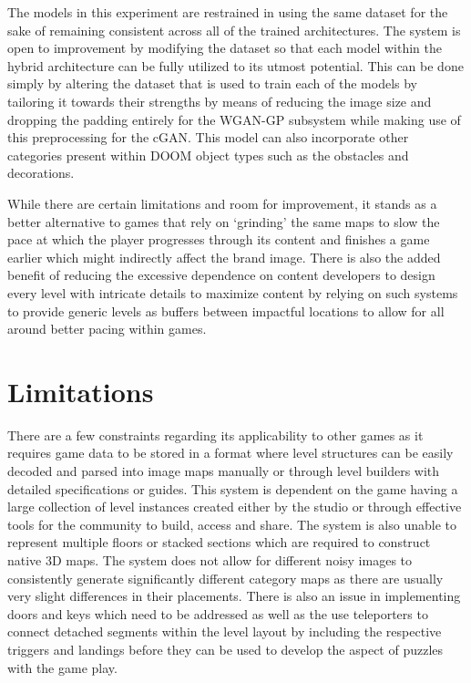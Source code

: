 \documentclass{Configuration_Files/PoliMi3i_thesis}
\begin{document}
The models in this experiment are restrained in using the same dataset for the sake of 
remaining consistent across all of the trained architectures. The system is open to 
improvement by modifying the dataset so that each model within the hybrid 
architecture can be fully utilized to its utmost potential. This can be done simply by 
altering the dataset that is used to train each of the models by tailoring it towards 
their strengths by means of reducing the image size and dropping the padding
entirely for the WGAN-GP subsystem while making use of this preprocessing for the 
cGAN. This model can also incorporate other categories present within DOOM object 
types such as the obstacles and decorations.

While there are certain limitations and room for improvement, it stands as a better 
alternative to games that rely on ‘grinding’ the same maps to slow the pace at which 
the player progresses through its content and finishes a game earlier which might 
indirectly affect the brand image. There is also the added benefit of reducing the 
excessive dependence on content developers to design every level with intricate 
details to maximize content by relying on such systems to provide generic levels as 
buffers between impactful locations to allow for all around better pacing within 
games.

\section{Limitations}
There are a few constraints regarding its applicability to other games as it requires 
game data to be stored in a format where level structures can be easily decoded and 
parsed into image maps manually or through level builders with detailed 
specifications or guides. This system is dependent on the game having a large 
collection of level instances created either by the studio or through effective tools for 
the community to build, access and share. The system is also unable to represent 
multiple floors or stacked sections which are required to construct native 3D maps.
The system does not allow for different noisy images to consistently generate
significantly different category maps as there are usually very slight differences in 
their placements. There is also an issue in implementing doors and keys which need 
to be addressed as well as the use teleporters to connect detached segments within 
the level layout by including the respective triggers and landings before they can be 
used to develop the aspect of puzzles with the game play. 
\end{document}

